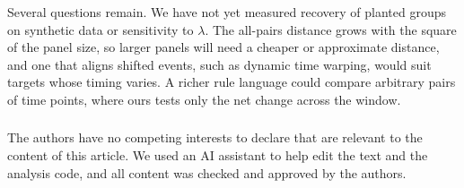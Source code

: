 \documentclass[runningheads]{llncs}
\begin{document}
Several questions remain. We have not yet measured recovery of planted groups on synthetic data or sensitivity to $\lambda$. The all-pairs distance grows with the square of the panel size, so larger panels will need a cheaper or approximate distance, and one that aligns shifted events, such as dynamic time warping, would suit targets whose timing varies. A richer rule language could compare arbitrary pairs of time points, where ours tests only the net change across the window.

\begin{credits}
\subsubsection{\ackname}
\subsubsection{\discintname}
The authors have no competing interests to declare that are relevant to the content of this article. We used an AI assistant to help edit the text and the analysis code, and all content was checked and approved by the authors.
\end{credits}

\clearpage




\end{document}
